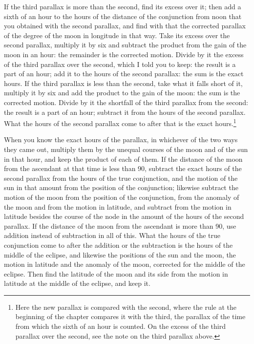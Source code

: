 \documentclass[11pt]{article}
\begin{document}
\par If the third parallax is more than the second, find its excess over it; then add a sixth of an hour to the hours of the distance of the conjunction from noon that you obtained with the second parallax, and find with that the corrected parallax of the degree of the moon in longitude in that way. Take its excess over the second parallax, multiply it by six and subtract the product from the gain of the moon in an hour: the remainder is the corrected motion. Divide by it the excess of the third parallax over the second, which I told you to keep: the result is a part of an hour; add it to the hours of the second parallax: the sum is the exact hours. If the third parallax is less than the second, take what it falls short of it, multiply it by six and add the product to the gain of the moon: the sum is the corrected motion. Divide by it the shortfall of the third parallax from the second: the result is a part of an hour; subtract it from the hours of the second parallax. What the hours of the second parallax come to after that is the exact hours.\footnote{Here the new parallax is compared with the second, where the rule at the beginning of the chapter compares it with the third, the parallax of the time from which the sixth of an hour is counted. On the excess of the third parallax over the second, see the note on the third parallax above.}\par
\par When you know the exact hours of the parallax, in whichever of the two ways they came out, multiply them by the unequal courses of the moon and of the sun in that hour, and keep the product of each of them. If the distance of the moon from the ascendant at that time is less than 90, subtract the exact hours of the second parallax from the hours of the true conjunction, and the motion of the sun in that amount from the position of the conjunction; likewise subtract the motion of the moon from the position of the conjunction, from the anomaly of the moon and from the motion in latitude, and subtract from the motion in latitude besides the course of the node in the amount of the hours of the second parallax. If the distance of the moon from the ascendant is more than 90, use addition instead of subtraction in all of this. What the hours of the true conjunction come to after the addition or the subtraction is the hours of the middle of the eclipse, and likewise the positions of the sun and the moon, the motion in latitude and the anomaly of the moon, corrected for the middle of the eclipse. Then find the latitude of the moon and its side from the motion in latitude at the middle of the eclipse, and keep it.\par
\end{document}
